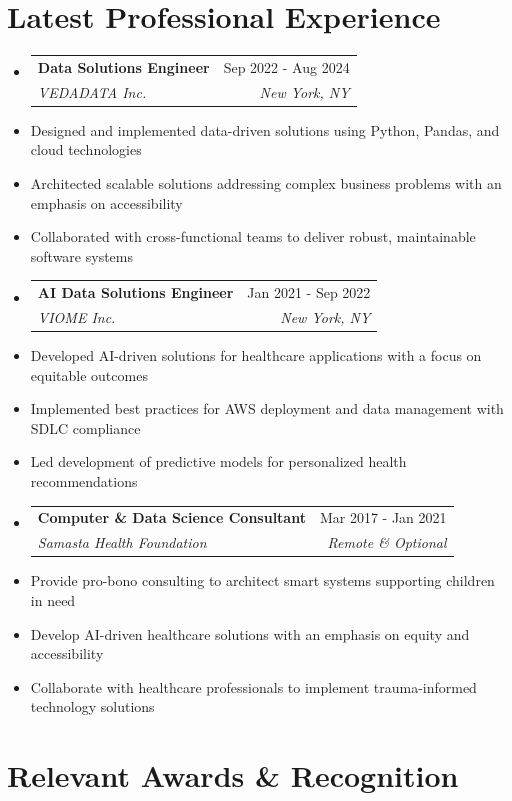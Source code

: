 \documentclass[10pt]{article}
\makeatletter
\newcommand{\resumeItem}[1]{\item\small{#1}}
\newcommand{\resumeSubheading}[4]{
  \vspace{-1pt}\item
    \begin{tabular*}{0.97\textwidth}[t]{l@{\extracolsep{\fill}}r}
      \textbf{#1} & #2 \\
      \textit{\small#3} & \textit{\small #4} \\
    \end{tabular*}\vspace{-5pt}
}
\makeatother
\begin{document}

\section{Latest Professional Experience}

\begin{itemize}[leftmargin=*]
\resumeSubheading
{Data Solutions Engineer}{Sep 2022 - Aug 2024}
{VEDADATA Inc.}{New York, NY}
\resumeItem{Designed and implemented data-driven solutions using Python, Pandas, and cloud technologies}
\resumeItem{Architected scalable solutions addressing complex business problems with an emphasis on accessibility}
\resumeItem{Collaborated with cross-functional teams to deliver robust, maintainable software systems}

\resumeSubheading
{AI Data Solutions Engineer}{Jan 2021 - Sep 2022}
{VIOME Inc.}{New York, NY}
\resumeItem{Developed AI-driven solutions for healthcare applications with a focus on equitable outcomes}
\resumeItem{Implemented best practices for AWS deployment and data management with SDLC compliance}
\resumeItem{Led development of predictive models for personalized health recommendations}


\resumeSubheading
{Computer \& Data Science Consultant}{Mar 2017 - Jan 2021}
{Samasta Health Foundation}{Remote \& Optional}
\resumeItem{Provide pro-bono consulting to architect smart systems supporting children in need}
\resumeItem{Develop AI-driven healthcare solutions with an emphasis on equity and accessibility}
\resumeItem{Collaborate with healthcare professionals to implement trauma-informed technology solutions}
\end{itemize}


\section{Relevant Awards \& Recognition}
\end{document}
